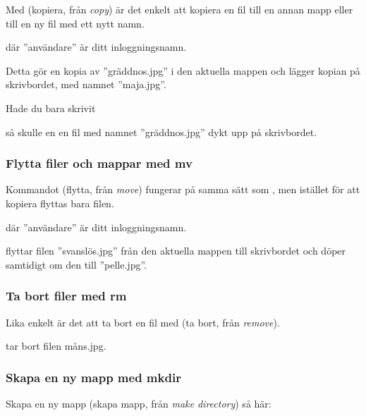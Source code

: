 \documentclass[a4paper,final]{memoir} %
\begin{document}
Med  (kopiera, från \textit{copy}) är det enkelt att kopiera en fil till en annan mapp eller till en ny fil med ett nytt namn.


där ''användare'' är ditt inloggningsnamn.

Detta gör en kopia av ''gräddnos.jpg'' i den aktuella mappen och lägger kopian på skrivbordet, med namnet ''maja.jpg''.

Hade du bara skrivit 


så skulle en en fil med namnet ''gräddnos.jpg'' dykt upp på skrivbordet.

\subsubsection{Flytta filer och mappar med mv}\label{sec:mv} 

Kommandot  (flytta, från \textit{move}) fungerar på samma sätt som , men istället för att kopiera flyttas bara filen.


där ''användare'' är ditt inloggningsnamn.

flyttar filen ''svanslös.jpg'' från den aktuella mappen till skrivbordet och döper samtidigt om den till ''pelle.jpg''.

\subsubsection{Ta bort filer med rm}\label{sec:rm} 

Lika enkelt är det att ta bort en fil med  (ta bort, från \textit{remove}).


tar bort filen måns.jpg.

\subsubsection{Skapa en ny mapp med mkdir}\label{sec:mkdir} 

Skapa en ny mapp  (skapa mapp, från \textit{make directory}) så här:

\end{document}
